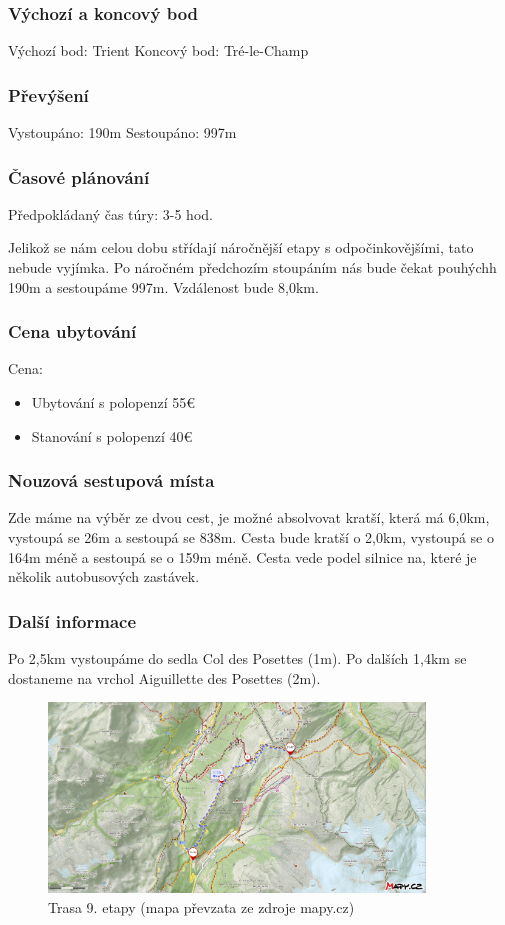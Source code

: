 \subsubsection*{Výchozí a koncový bod}
\noindent Výchozí bod: Trient
\noindent Koncový bod: Tré-le-Champ
\subsubsection*{Převýšení}
\noindent Vystoupáno: 190\:m
\noindent Sestoupáno: 997\:m
\subsubsection*{Časové plánování}
\noindent Předpokládaný čas túry: 3-5 hod.

Jelikož se nám celou dobu střídají náročnější etapy s odpočinkovějšími, tato nebude vyjímka. Po náročném předchozím stoupáním nás bude čekat pouhýchh 190\:m a sestoupáme 997\:m. Vzdálenost bude 8,0\:km. 
\subsubsection*{Cena ubytování}
\noindent Cena:
\begin{itemize}
	\item Ubytování s polopenzí 55\:€
	\item Stanování s polopenzí 40\:€
\end{itemize}
\subsubsection*{Nouzová sestupová místa}
Zde máme na výběr ze dvou cest, je možné absolvovat kratší, která má 6,0\:km, vystoupá se 26\:m a sestoupá se 838\:m. Cesta bude kratší o 2,0\:km, vystoupá se o 164\:m méně a sestoupá se o 159\:m méně. Cesta vede podel silnice na, které je několik autobusových zastávek.
\subsubsection*{Další informace}
Po 2,5\:km vystoupáme do sedla Col des Posettes (1\:m). Po dalších 1,4\:km se dostaneme na vrchol Aiguillette des Posettes (2\:m).
\begin{figure}[!hbt]
    \centering
    \includegraphics[width=10.0cm]{Figures/day_9.png}
    \caption[Trasa: den devátý]{Trasa 9. etapy (mapa převzata ze zdroje mapy.cz)}
    \label{Obr:day_9}
\end{figure} 
